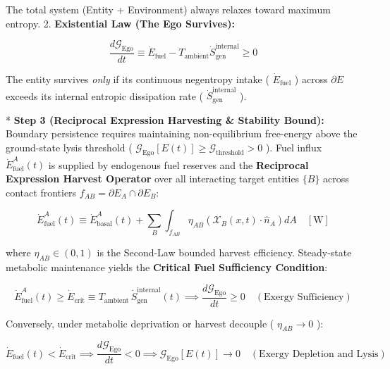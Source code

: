 \documentclass[11pt,a4paper]{article}
\theoremstyle{definition}
\theoremstyle{remark}
\begin{document}
The total system (Entity + Environment) always relaxes toward maximum entropy.
2. \textbf{Existential Law (The Ego Survives):}


\begin{equation}
\frac{d\mathcal{G}_{\text{Ego}}}{dt} \equiv \dot{E}_{\text{fuel}} - T_{\text{ambient}} \dot{S}_{\text{gen}}^{\text{internal}} \ge 0
\end{equation}


The entity survives \textit{only} if its continuous negentropy intake ( $\dot{E}_{\text{fuel}}$ ) across $\partial E$ exceeds its internal entropic dissipation rate ( $\dot{S}_{\text{gen}}^{\text{internal}}$ ).

* \textbf{Step 3 (Reciprocal Expression Harvesting \& Stability Bound):}
Boundary persistence requires maintaining non-equilibrium free-energy above the ground-state lysis threshold ( $\mathcal{G}_{\text{Ego}}[E(t)] \ge \mathcal{G}_{\text{threshold}} > 0$ ). Fuel influx $\dot{E}_{\text{fuel}}^A(t)$ is supplied by endogenous fuel reserves and the \textbf{Reciprocal Expression Harvest Operator} over all interacting target entities $\{B\}$ across contact frontiers $f_{AB} = \partial E_A \cap \partial E_B$:


\begin{equation}
\boxed{\dot{E}_{\text{fuel}}^A(t) \equiv \dot{E}_{\text{basal}}^A(t) + \sum_{B} \int_{f_{AB}} \eta_{AB} \left( \boldsymbol{\mathcal{X}}_B(x, t) \cdot \hat{n}_A \right) dA \quad [\mathrm{W}]}
\end{equation}


where $\eta_{AB} \in (0, 1)$ is the Second-Law bounded harvest efficiency. Steady-state metabolic maintenance yields the \textbf{Critical Fuel Sufficiency Condition}:


\begin{equation}
\boxed{\dot{E}_{\text{fuel}}^A(t) \ge \dot{E}_{\text{crit}} \equiv T_{\text{ambient}} \, \dot{S}_{\text{gen}}^{\text{internal}}(t) \implies \frac{d\mathcal{G}_{\text{Ego}}}{dt} \ge 0 \quad (\text{Exergy Sufficiency})}
\end{equation}


Conversely, under metabolic deprivation or harvest decouple ( $\eta_{AB} \to 0$ ):


\begin{equation}
\boxed{\dot{E}_{\text{fuel}}(t) < \dot{E}_{\text{crit}} \implies \frac{d\mathcal{G}_{\text{Ego}}}{dt} < 0 \implies \mathcal{G}_{\text{Ego}}[E(t)] \longrightarrow 0 \quad (\text{Exergy Depletion  and  Lysis})}
\end{equation}
\end{document}
